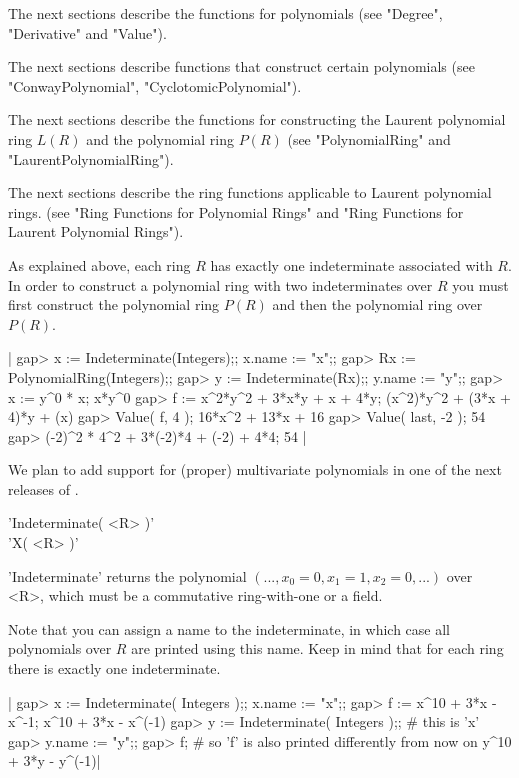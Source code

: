 The next sections describe the functions for polynomials  (see  "Degree",
"Derivative" and "Value").

The next sections describe functions that construct certain polynomials
(see "ConwayPolynomial", "CyclotomicPolynomial").

The  next  sections describe the  functions  for constructing the Laurent
polynomial  ring   $L(R)$   and   the   polynomial   ring   $P(R)$   (see
"PolynomialRing" and "LaurentPolynomialRing").

The  next  sections  describe the ring  functions  applicable  to Laurent
polynomial rings. (see "Ring  Functions for Polynomial  Rings" and  "Ring
Functions for Laurent Polynomial Rings").



As  explained  above,  each  ring   $R$  has  exactly  one  indeterminate
associated with  $R$.  In order to construct a  polynomial  ring with two
indeterminates  over $R$  you  must first  construct the polynomial  ring
$P(R)$ and then the polynomial ring over $P(R)$.

|    gap> x  := Indeterminate(Integers);; x.name := "x";;
    gap> Rx := PolynomialRing(Integers);;
    gap> y  := Indeterminate(Rx);; y.name := "y";;
    gap> x  := y^0 * x;
    x*y^0
    gap> f := x^2*y^2 + 3*x*y + x + 4*y;
    (x^2)*y^2 + (3*x + 4)*y + (x)
    gap> Value( f, 4 );
    16*x^2 + 13*x + 16
    gap> Value( last, -2 );
    54
    gap> (-2)^2 * 4^2 + 3*(-2)*4 + (-2) + 4*4;
    54 |

We  plan  to add support for (proper) multivariate polynomials  in one of
the next releases of {\GAP}.

%

'Indeterminate( <R> )'\\
'X( <R> )'

'Indeterminate' returns the polynomial $(..., x_0 = 0, x_1 = 1, x_2 =  0,
...)$ over <R>, which must be a commutative ring-with-one or a field.

Note  that you can assign a name to the indeterminate,  in which case all
polynomials over  $R$ are printed using this name. Keep in mind  that for
each ring there is exactly one indeterminate.

|    gap> x := Indeterminate( Integers );; x.name := "x";;
    gap> f := x^10 + 3*x - x^-1;        
    x^10 + 3*x - x^(-1)
    gap> y := Indeterminate( Integers );;    # this is 'x'
    gap> y.name := "y";;
    gap> f;    # so 'f' is also printed differently from now on
    y^10 + 3*y - y^(-1)|


